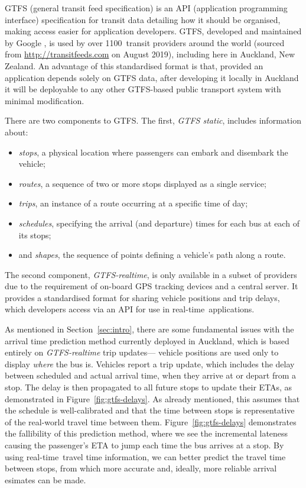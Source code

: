 \documentclass[times, doublespace]{anzsauth}
\newcommand{\rt}{real-time\ }
\begin{document}
GTFS (general transit feed specification)
is an API (application programming interface) specification for transit data
detailing how it should be organised,
making access easier for application developers.
GTFS, developed and maintained by Google \citep{GoogleDevelopers_2006},
is used by over 1100~transit providers around the world
(sourced from \url{http://transitfeeds.com} on August 2019),
including here in Auckland, New Zealand.
An advantage of this standardised format is that,
provided an application depends solely on GTFS data,
after developing it locally in Auckland it will be deployable to any other GTFS-based
public transport system with minimal modification.


There are two components to GTFS.
The first, \emph{GTFS static}, includes information about:
\begin{itemize}
\item \emph{stops}, a physical location where passengers can embark and disembark the vehicle;
\item \emph{routes}, a sequence of two or more stops displayed as a single service;
\item \emph{trips}, an instance of a route occurring at a specific time of day;
\item \emph{schedules}, specifying the arrival (and departure) times for each bus at each of its stops;
\item and \emph{shapes}, the sequence of points defining a vehicle's path along a route.
\end{itemize}
The second component, \emph{GTFS-realtime},
is only available in a subset of providers due to the requirement of
on-board GPS tracking devices and a central server.
It provides a standardised format for sharing vehicle positions and trip delays,
which developers access via an API for use in \rt applications.

As mentioned in Section~\ref{sec:intro},
there are some fundamental issues with the arrival time prediction method currently
deployed in Auckland,
which is based entirely on \emph{GTFS-realtime} trip updates---%
vehicle positions are used only to display \emph{where} the bus is.
Vehicles report a trip update,
which includes the delay between scheduled and actual arrival time,
when they arrive at or depart from a stop.
The delay is then propagated to all future stops to update their ETAs,
as demonstrated in Figure~\ref{fig:gtfs-delays}.
As already mentioned, this assumes that the schedule is well-calibrated
and that the time between stops
is representative of the real-world travel time between them.
Figure~\ref{fig:gtfs-delays} demonstrates the fallibility of this prediction method,
where we see the incremental lateness causing the passenger's ETA to
jump each time the bus arrives at a stop.
By using \rt travel time information,
we can better predict the travel time between stops,
from which more accurate and, ideally, more reliable arrival esimates
can be made.
\end{document}
